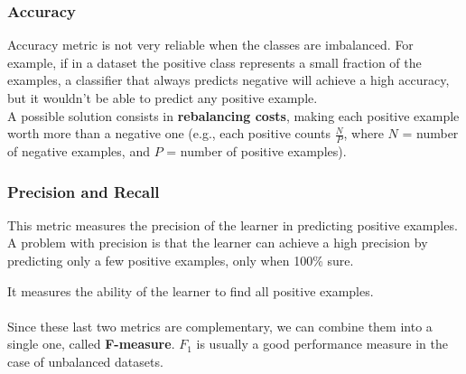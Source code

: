 \subsubsection{Accuracy}
Accuracy metric is not very reliable when the classes are imbalanced. For example, if in a dataset the
positive class represents a small fraction of the examples, a classifier that always predicts negative will achieve 
a high accuracy, but it wouldn't be able to predict any positive example.
\\ A possible solution consists in \textbf{rebalancing costs}, making each positive example worth more than a negative one 
(e.g., each positive counts $\frac{N}{P}$, where $N$ = number of negative examples, and $P$ = number of positive examples).

\subsubsection{Precision and Recall}
\begin{figure}[H]
\end{figure}
This metric measures the precision of the learner in predicting positive examples. A problem with precision is that
the learner can achieve a high precision by predicting only a few positive examples, only when 100\% sure.

It measures the ability of the learner to find all positive examples.
\\\\Since these last two metrics are complementary, we can combine them into a single one, called \textbf{F-measure}.
$F_1$ is usually a good performance measure in the case of unbalanced datasets.


